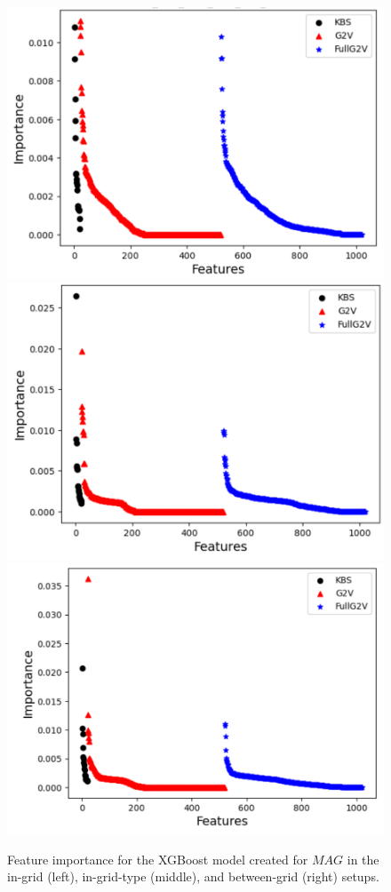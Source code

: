 \documentclass[letterpaper]{article} %
\newcommand{\mapfgas}[1]{\ensuremath{\textit{MAG}}\xspace}
\begin{document}
\begin{figure}[tbhp]
    \centering
    \includegraphics[width=0.6\columnwidth]{Images/in-grid-fi.pdf}
    \includegraphics[width=0.6\columnwidth]{Images/in-grid-type-fi.pdf}
    \includegraphics[width=0.6\columnwidth]{Images/between-grid-fi2.pdf}
    \caption{Feature importance for the XGBoost model created for \mapfgas\, in the in-grid (left), in-grid-type (middle), and between-grid (right) setups.}
    \label{fig:model_coefs}
\end{figure}
\end{document}
